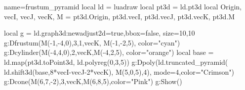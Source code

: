 \begin{luadraw}{name=frustum_pyramid}
local ld = luadraw
local pt3d = ld.pt3d
local Origin, vecI, vecJ, vecK, M = pt3d.Origin, pt3d.vecI, pt3d.vecJ, pt3d.vecK, pt3d.M

local g = ld.graph3d:new{adjust2d=true,bbox=false, size={10,10} }
g:Dfrustum(M(-1,-4,0),3,1,vecK, M(-1,-2,5), {color="cyan"})
g:Dcylinder(M(-4,4,0),2,vecK,M(-4,2,5), {color="orange"})
local base = ld.map(pt3d.toPoint3d, ld.polyreg(0,3,5))
g:Dpoly(ld.truncated_pyramid( ld.shift3d(base,8*vecI-vecJ-2*vecK), M(5,0,5),4), {mode=4,color="Crimson"})
g:Dcone(M(6,7,-2),3,vecK,M(6,8,5),{color="Pink"})
g:Show()
\end{luadraw}
